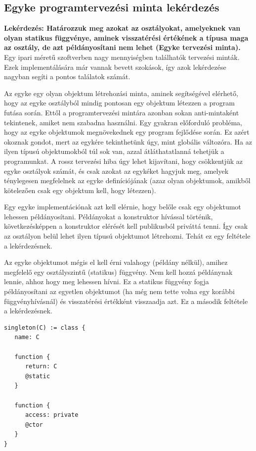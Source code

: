 \documentclass[a4paper,12pt]{report}
\begin{document}
\subsection{Egyke programtervezési minta lekérdezés}
\textbf{Lekérdezés: Határozzuk meg azokat az osztályokat, amelyeknek van olyan statikus függvénye, aminek visszatérési értékének a típusa maga az osztály, de azt példányosítani nem lehet (Egyke tervezési minta).}
\\
Egy ipari méretű szoftverben nagy mennyiségben találhatók tervezési minták. Ezek implementálására már vannak bevett szokások, így azok lekérdezése nagyban segíti a pontos találatok számát.
\par Az egyke egy olyan objektum létrehozási minta, aminek segítségével elérhető, hogy az egyke osztályból mindig pontosan egy objektum létezzen a program futása során. Ettől a programtervezési mintára azonban sokan anti-mintaként tekintenek, amiket nem szabadna használni. Egy gyakran előforduló probléma, hogy az egyke objektumok megnövekednek egy program fejlődése során. Ez azért okoznak gondot, mert az egykére tekinthetünk úgy, mint globális változóra. Ha az ilyen típusú objektumokból túl sok van, azzal átláthatatlanná tehetjük a programunkat. A rossz tervezési hiba úgy lehet kijavítani, hogy csökkentjük az egyke osztályok számát, és csak azokat az egykéket hagyjuk meg, amelyek ténylegesen megfelelnek az egyke definíciójának (azaz olyan objektumok, amikből kötelezően csak egy objektum kell, hogy létezzen).
\par Egy egyke implementációnak azt kell elérnie, hogy belőle csak egy objektumot lehessen példányosítani. Példányokat a konstruktor hívással történik, következésképpen a konstruktor elérését kell publikusból priváttá tenni. Így csak az osztályon belül lehet ilyen típusú objektumot létrehozni. Tehát ez egy feltétele a lekérdezésnek.
\par Az egyke objektumot mégis el kell érni valahogy (példány nélkül), amihez megfelelő egy osztályszintű (statikus) függvény. Nem kell hozzá példánynak lennie, ahhoz hogy meg lehessen hívni. Ez a statikus függvény fogja példányosítani az egyetlen objektumot (ha még nem tette volna egy korábbi függvényhívásnál) és visszatérési értékként visszaadja azt. Ez a második feltétele a lekérdezésnek.
\begin{verbatim}
singleton(C) := class {
   name: C
   
   function {
      return: C
      @static
   }

   function {
      access: private 
      @ctor      
   }
}
\end{verbatim}
\end{document}
